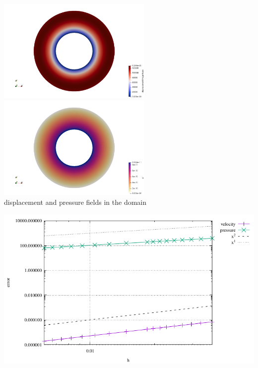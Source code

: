 \begin{center}
\includegraphics[width=7.5cm]{python_codes/fieldstone_36/results/disp}
\includegraphics[width=7.5cm]{python_codes/fieldstone_36/results/p}\\
{\captionfont displacement and pressure fields in the domain}
\end{center}

\begin{center}
\includegraphics[width=16cm]{python_codes/fieldstone_36/results/errors}
\end{center}

